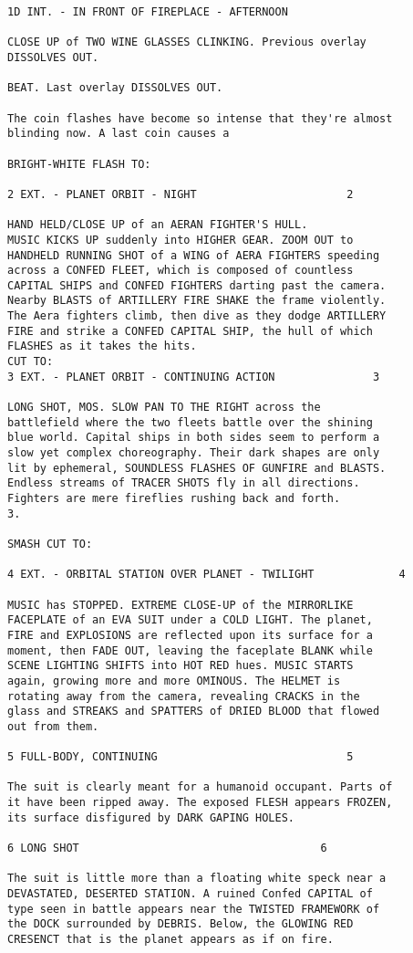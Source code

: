 \begin{verbatim}
1D INT. - IN FRONT OF FIREPLACE - AFTERNOON

CLOSE UP of TWO WINE GLASSES CLINKING. Previous overlay
DISSOLVES OUT.

BEAT. Last overlay DISSOLVES OUT.

The coin flashes have become so intense that they're almost
blinding now. A last coin causes a

BRIGHT-WHITE FLASH TO:

2 EXT. - PLANET ORBIT - NIGHT 						2

HAND HELD/CLOSE UP of an AERAN FIGHTER'S HULL.
MUSIC KICKS UP suddenly into HIGHER GEAR. ZOOM OUT to
HANDHELD RUNNING SHOT of a WING of AERA FIGHTERS speeding
across a CONFED FLEET, which is composed of countless
CAPITAL SHIPS and CONFED FIGHTERS darting past the camera.
Nearby BLASTS of ARTILLERY FIRE SHAKE the frame violently.
The Aera fighters climb, then dive as they dodge ARTILLERY
FIRE and strike a CONFED CAPITAL SHIP, the hull of which
FLASHES as it takes the hits.
CUT TO:
3 EXT. - PLANET ORBIT - CONTINUING ACTION 				3

LONG SHOT, MOS. SLOW PAN TO THE RIGHT across the
battlefield where the two fleets battle over the shining
blue world. Capital ships in both sides seem to perform a
slow yet complex choreography. Their dark shapes are only
lit by ephemeral, SOUNDLESS FLASHES OF GUNFIRE and BLASTS.
Endless streams of TRACER SHOTS fly in all directions.
Fighters are mere fireflies rushing back and forth.
3.

SMASH CUT TO:

4 EXT. - ORBITAL STATION OVER PLANET - TWILIGHT 			4

MUSIC has STOPPED. EXTREME CLOSE-UP of the MIRRORLIKE
FACEPLATE of an EVA SUIT under a COLD LIGHT. The planet,
FIRE and EXPLOSIONS are reflected upon its surface for a
moment, then FADE OUT, leaving the faceplate BLANK while
SCENE LIGHTING SHIFTS into HOT RED hues. MUSIC STARTS
again, growing more and more OMINOUS. The HELMET is
rotating away from the camera, revealing CRACKS in the
glass and STREAKS and SPATTERS of DRIED BLOOD that flowed
out from them.

5 FULL-BODY, CONTINUING 							5

The suit is clearly meant for a humanoid occupant. Parts of
it have been ripped away. The exposed FLESH appears FROZEN,
its surface disfigured by DARK GAPING HOLES.

6 LONG SHOT 									6

The suit is little more than a floating white speck near a
DEVASTATED, DESERTED STATION. A ruined Confed CAPITAL of
type seen in battle appears near the TWISTED FRAMEWORK of
the DOCK surrounded by DEBRIS. Below, the GLOWING RED
CRESENCT that is the planet appears as if on fire.


\end{verbatim}
